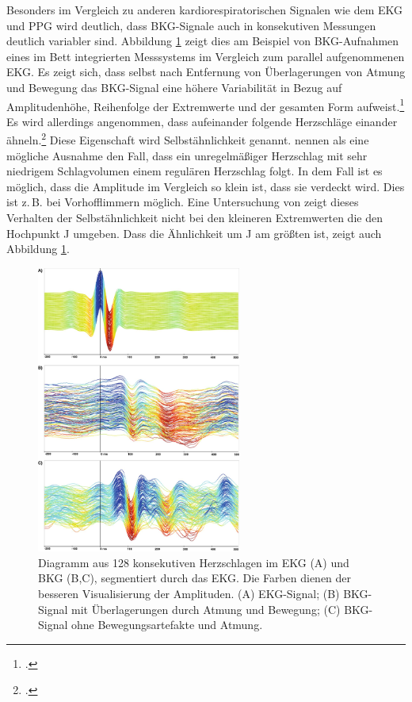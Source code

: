 	
	Besonders im Vergleich zu anderen kardiorespiratorischen Signalen wie dem \ac{EKG} und \ac{PPG} wird deutlich, dass \ac{BKG}-Signale auch in konsekutiven Messungen deutlich variabler sind. Abbildung \ref{fig:variabilitaet} zeigt dies am Beispiel von \ac{BKG}-Aufnahmen eines im Bett integrierten Messsystems im Vergleich zum parallel aufgenommenen \ac{EKG}. Es zeigt sich, dass selbst nach Entfernung von Überlagerungen von Atmung  und Bewegung das \ac{BKG}-Signal eine höhere Variabilität in Bezug auf Amplitudenhöhe, Reihenfolge der Extremwerte und der gesamten Form aufweist.\footcite{Zink2017} Es wird allerdings angenommen, dass aufeinander folgende Herzschläge einander ähneln.\footcite{Bruser2013} Diese Eigenschaft wird Selbstähnlichkeit genannt. \citeauthor{Bruser2013} nennen als eine mögliche Ausnahme den Fall, dass ein unregelmäßiger Herzschlag mit sehr niedrigem Schlagvolumen einem regulären Herzschlag folgt. In dem Fall ist es möglich, dass die Amplitude im Vergleich so klein ist, dass sie verdeckt wird. Dies ist z.\,B. bei Vorhofflimmern möglich. Eine Untersuchung von \citeauthor{Rosales2012} zeigt dieses Verhalten der Selbstähnlichkeit nicht bei den kleineren Extremwerten die den Hochpunkt J umgeben. Dass die Ähnlichkeit um J am größten ist, zeigt auch Abbildung \ref{fig:variabilitaet}.
	
	\begin{figure}[H]
		\centering
		\includegraphics[width=0.6\textwidth]{pic/Variabilitaet.jpg}
		\caption[Visualisierung der Variabilität des \ac{BKG}-Signals]{Diagramm aus 128 konsekutiven Herzschlagen im EKG (A) und BKG (B,C), segmentiert durch das EKG. Die Farben dienen der besseren Visualisierung der Amplituden. (A) EKG-Signal; (B) BKG-Signal mit Überlagerungen durch Atmung und Bewegung; (C) \ac{BKG}-Signal ohne Bewegungsartefakte und Atmung.\protect\footnotemark}
		\label{fig:variabilitaet}
	\end{figure}
	
